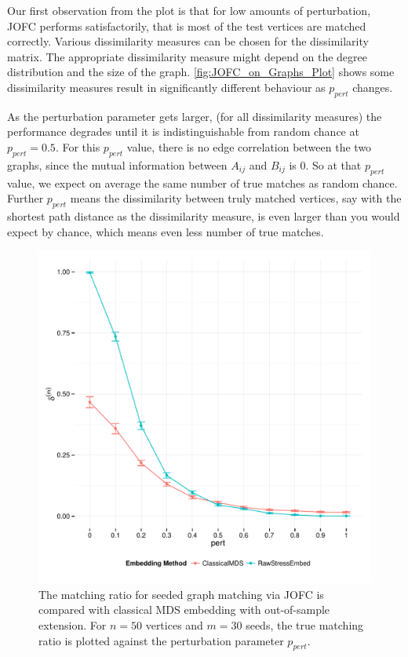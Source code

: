 \documentclass[12pt,oneside,final]{thesis}\usepackage[]{graphicx}\usepackage[]{color}
\makeatletter
\def\maxwidth{ %
  \ifdim\Gin@nat@width>\linewidth
    \linewidth
  \else
    \Gin@nat@width
  \fi
}
\newenvironment{knitrout}{}{} %
\makeatother
\begin{document}
Our first observation from the plot is that for low amounts of perturbation, JOFC performs satisfactorily, that is most of the test vertices are matched correctly. Various dissimilarity measures can be chosen for the dissimilarity matrix. The appropriate dissimilarity measure might depend on the degree distribution and the size of the graph. \autoref{fig:JOFC_on_Graphs_Plot} shows some dissimilarity measures result in significantly different behaviour as $p_{pert}$  changes.

 As the perturbation parameter gets larger, (for all dissimilarity measures) the performance  degrades until it is indistinguishable from random chance at $p_{pert}=0.5$. For this $p_{pert}$ value, there is no edge correlation between the two graphs, since the mutual information between $A_{ij}$ and $B_{ij}$ is 0. So at that  $p_{pert}$ value, we expect on average the same number of true matches as random chance. Further $p_{pert}$ means the dissimilarity between truly matched vertices, say  with the shortest path distance as the dissimilarity measure, is even larger than you would expect by chance, which means even less number of true matches.




\begin{knitrout}
\color{fgcolor}\begin{figure}[]

\includegraphics[width=\maxwidth]{figure/JOFC_vs_cMDS_on_ER_graph} \caption[The matching ratio for seeded graph matching via JOFC is compared with classical MDS embedding with out-of-sample extension]{The matching ratio for seeded graph matching via JOFC is compared with classical MDS embedding with out-of-sample extension. For $n=50$ vertices and $m=30$ seeds, the true matching ratio is plotted against the perturbation parameter $p_{pert}$.\label{fig:JOFC_vs_cMDS_on_ER_graph}}
\end{figure}


\end{knitrout}
\end{document}
